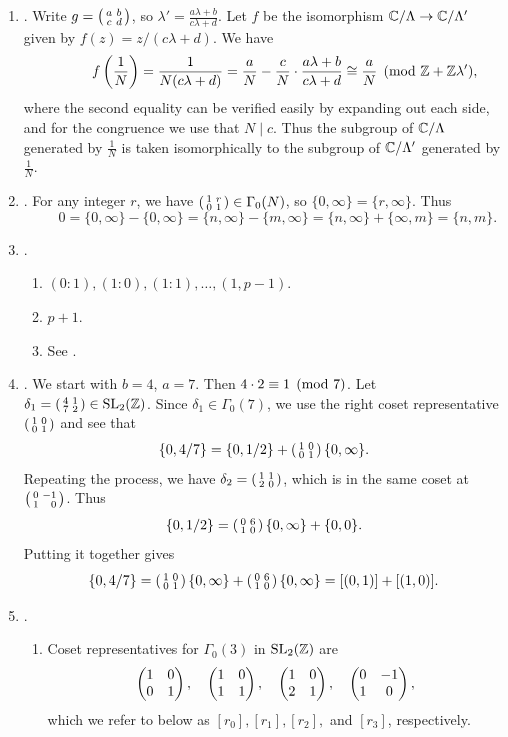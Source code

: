 \begin{enumerate}

\item {}. 
Write $g=\left( \begin{smallmatrix}a&b\\c&d\end{smallmatrix}\right)$, so 
$\lambda' = \frac{a\lambda + b}{c\lambda + d}$.
Let $f$ be the isomorphism $\mathbb{C}/\Lambda \to \mathbb{C}/\Lambda'$
given by $f(z) = z/(c\lambda + d)$.
We have
$$
 \qquad\quad f\left(\frac{1}{N}\right) = 
    \frac{1}{N(c\lambda + d)} = \frac{a}{N} - \frac{c}{N} \cdot \frac{a \lambda + b}{c\lambda + d}
   \cong \frac{a}{N} \pmod{\mathbb{Z} + \mathbb{Z} \lambda'},
$$
where the second equality can be verified easily by expanding out each side,
and for the congruence we use that $N\mid c$.
Thus the subgroup of $\mathbb{C}/\Lambda$ generated by $\frac{1}{N}$ is
taken isomorphically to the subgroup of $\mathbb{C}/\Lambda'$ generated
by $\frac{1}{N}$.

\item {}. 
For any integer $r$, 
we have $\left( \begin{smallmatrix}1&r\\0&1\end{smallmatrix}\right)\in \Gamma_0(N)$,
so $\{0,\infty\} = \{r, \infty\}$.
Thus
$$
  \qquad  0 = \{0,\infty\} - \{0,\infty\} = 
           \{n,\infty\} - \{m,\infty\} = 
               \{n,\infty\} + \{\infty, m\} = \{n,m\}.
$$

\item {}.
\begin{enumerate}
\item $(0:1), (1:0), (1:1), \ldots, (1,p-1)$.
\item $p+1$.
\item See \cite[Prop.~2.2.1]{cremona:algs}.
\end{enumerate}

\item {}.
We start with $b=4$, $a=7$.  Then $4\cdot 2 \equiv 1\pmod{7}$.
Let $\delta_1 = \left( \begin{smallmatrix}4&1\\7&2\end{smallmatrix}\right)\in\operatorname{SL}_2(\mathbb{Z})$.  Since 
$\delta_1\in \Gamma_0(7)$,
we use the right coset representative $\left( \begin{smallmatrix}1&0\\0&1\end{smallmatrix}\right)$ and see that
$$
   \{0,4/7\} = \{0,1/2\} + \left( \begin{smallmatrix}1&0\\0&1\end{smallmatrix}\right)\{0,\infty\}.
$$
Repeating the process, we have $\delta_2 = \left( \begin{smallmatrix}1&1\\2&0\end{smallmatrix}\right)$, which is
in the same coset at $\abcd{0}{-1}{1}{\hfill0}$.  Thus
$$
\{0,1/2\} = \left( \begin{smallmatrix}0&6\\1&0\end{smallmatrix}\right) \{0,\infty\} + \{0,0\}.
$$
Putting it together gives 
$$
  \{0,4/7\} = \left( \begin{smallmatrix}1&0\\0&1\end{smallmatrix}\right) \{0,\infty\} + \left( \begin{smallmatrix}0&6\\1&0\end{smallmatrix}\right)\{0,\infty\}
             = [(0,1)] + [(1,0)].
$$

\item {}.
\begin{enumerate}
\item Coset representatives for $\Gamma_0(3)$ in $\operatorname{SL}_2(\mathbb{Z})$ are 
$$
\left( \begin{matrix} 1 & 0  \\ 0  & 1  \end{matrix}\right),\quad
\left( \begin{matrix} 1 & 0 \\ 1  & 1  \end{matrix}\right),\quad
\left( \begin{matrix} 1 & 0  \\ 2  & 1  \end{matrix}\right),\quad
\left( \begin{matrix} 0 & -1  \\ 1  & 0  \end{matrix}\right),
$$
which we refer to below as $[r_0], [r_1], [r_2], $ and $[r_3]$, respectively. 


\end{enumerate}
\end{enumerate}
